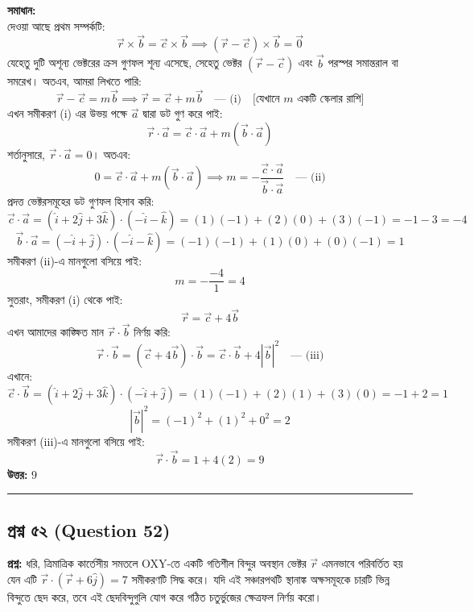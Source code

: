 \documentclass[12pt]{article}
\begin{document}
\textbf{সমাধান:} \\
দেওয়া আছে প্রথম সম্পর্কটি:
$$\vec{r} \times \vec{b} = \vec{c} \times \vec{b} \implies (\vec{r} - \vec{c}) \times \vec{b} = \vec{0}$$
যেহেতু দুটি অশূন্য ভেক্টরের ক্রস গুণফল শূন্য এসেছে, সেহেতু ভেক্টর $(\vec{r} - \vec{c})$ এবং $\vec{b}$ পরস্পর সমান্তরাল বা সমরেখ। অতএব, আমরা লিখতে পারি:
$$\vec{r} - \vec{c} = m\vec{b} \implies \vec{r} = \vec{c} + m\vec{b} \quad \text{--- (i)} \quad \text{[যেখানে } m \text{ একটি স্কেলার রাশি]}$$
এখন সমীকরণ (i) এর উভয় পক্ষে $\vec{a}$ দ্বারা ডট গুণ করে পাই:
$$\vec{r} \cdot \vec{a} = \vec{c} \cdot \vec{a} + m(\vec{b} \cdot \vec{a})$$
শর্তানুসারে, $\vec{r} \cdot \vec{a} = 0$। অতএব:
$$0 = \vec{c} \cdot \vec{a} + m(\vec{b} \cdot \vec{a}) \implies m = -\frac{\vec{c} \cdot \vec{a}}{\vec{b} \cdot \vec{a}} \quad \text{--- (ii)}$$
প্রদত্ত ভেক্টরসমূহের ডট গুণফল হিসাব করি:
$$\vec{c} \cdot \vec{a} = (\hat{i} + 2\hat{j} + 3\hat{k}) \cdot (-\hat{i} - \hat{k}) = (1)(-1) + (2)(0) + (3)(-1) = -1 - 3 = -4$$
$$\vec{b} \cdot \vec{a} = (-\hat{i} + \hat{j}) \cdot (-\hat{i} - \hat{k}) = (-1)(-1) + (1)(0) + (0)(-1) = 1$$
সমীকরণ (ii)-এ মানগুলো বসিয়ে পাই:
$$m = -\frac{-4}{1} = 4$$
সুতরাং, সমীকরণ (i) থেকে পাই:
$$\vec{r} = \vec{c} + 4\vec{b}$$
এখন আমাদের কাঙ্ক্ষিত মান $\vec{r} \cdot \vec{b}$ নির্ণয় করি:
$$\vec{r} \cdot \vec{b} = (\vec{c} + 4\vec{b}) \cdot \vec{b} = \vec{c} \cdot \vec{b} + 4|\vec{b}|^2 \quad \text{--- (iii)}$$
এখানে:
$$\vec{c} \cdot \vec{b} = (\hat{i} + 2\hat{j} + 3\hat{k}) \cdot (-\hat{i} + \hat{j}) = (1)(-1) + (2)(1) + (3)(0) = -1 + 2 = 1$$
$$|\vec{b}|^2 = (-1)^2 + (1)^2 + 0^2 = 2$$
সমীকরণ (iii)-এ মানগুলো বসিয়ে পাই:
$$\vec{r} \cdot \vec{b} = 1 + 4(2) = 9$$
\textbf{উত্তর:} $9$

\vspace{0.8cm}

\noindent\rule{\textwidth}{1pt}
\subsection*{প্রশ্ন ৫২ (Question 52)}

\textbf{প্রশ্ন:} ধরি, ত্রিমাত্রিক কার্তেসীয় সমতলে OXY-তে একটি গতিশীল বিন্দুর অবস্থান ভেক্টর $\vec{r}$ এমনভাবে পরিবর্তিত হয় যেন এটি $\vec{r} \cdot (\vec{r} + 6\hat{j}) = 7$ সমীকরণটি সিদ্ধ করে। যদি এই সঞ্চারপথটি স্থানাঙ্ক অক্ষসমূহকে চারটি ভিন্ন বিন্দুতে ছেদ করে, তবে এই ছেদবিন্দুগুলি যোগ করে গঠিত চতুর্ভুজের ক্ষেত্রফল নির্ণয় করো। 
\end{document}
